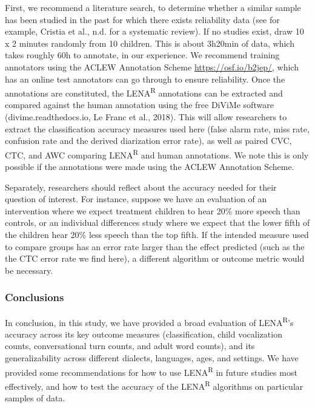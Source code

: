 \documentclass[english,table,man,floatsintext]{apa6}
\begin{document}
First, we recommend a literature search, to determine whether a similar sample has been studied in the past for which there exists reliability data (see for example, Cristia et al., n.d. for a systematic review). If no studies exist, draw 10 x 2 minutes randomly from 10 children. This is about 3h20min of data, which takes roughly 60h to annotate, in our experience. We recommend training annotators using the ACLEW Annotation Scheme \url{https://osf.io/b2jep/}, which has an online test annotators can go through to ensure reliability. Once the annotations are constituted, the LENA\textsuperscript{R} annotations can be extracted and compared against the human annotation using the free DiViMe software (divime.readthedocs.io, Le Franc et al., 2018). This will allow researchers to extract the classification accuracy measures used here (false alarm rate, miss rate, confusion rate and the derived diarization error rate), as well as paired CVC, CTC, and AWC comparing LENA\textsuperscript{R} and human annotations. We note this is only possible if the annotations were made using the ACLEW Annotation Scheme.

Separately, researchers should reflect about the accuracy needed for their question of interest. For instance, suppose we have an evaluation of an intervention where we expect treatment children to hear 20\% more speech than controls, or an individual differences study where we expect that the lower fifth of the children hear 20\% less speech than the top fifth. If the intended measure used to compare groups has an error rate larger than the effect predicted (such as the the CTC error rate we find here), a different algorithm or outcome metric would be necessary.

\hypertarget{conclusions}{%
\subsubsection{Conclusions}\label{conclusions}}

In conclusion, in this study, we have provided a broad evaluation of LENA\textsuperscript{R}'s accuracy across its key outcome measures (classification, child vocalization counts, conversational turn counts, and adult word counts), and its generalizability across different dialects, languages, ages, and settings. We have provided some recommendations for how to use LENA\textsuperscript{R} in future studies most effectively, and how to test the accuracy of the LENA\textsuperscript{R} algorithms on particular samples of data.
\end{document}
